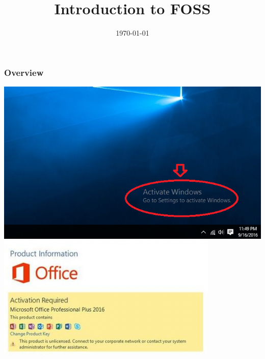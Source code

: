 \documentclass{beamer}
\title[Intro to FOSS]{Introduction to FOSS} %
\author{\color{cyan}{Software Freedom Day}} %
\institute[AITI-GI-KACE] %
{
	GHANA-INDIA KOFI ANNAN CENTER OF EXCELLENCE IN INFORMATION TECHNOLOGY \\
	(ADVANCED INFORMATION TECHONOLOGY INSTITUTE) \\ %
	\medskip
	\textit{\textbf{aiti-kace.com.gh}} %
}
\date{\today} %
\begin{document}
	
	\begin{frame}
		\titlepage %
	\end{frame}
	
	\begin{frame}
		\frametitle{Overview} %
		\tableofcontents %
	\end{frame}
	
	
	\begin{frame}
	\includegraphics[width=0.6\linewidth]{activatewatermark}
	\includegraphics[width=0.6\linewidth]{activateoffice.png}
	\end{frame}
\end{document}
